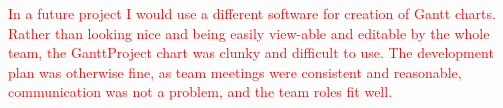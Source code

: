\documentclass{article}
\begin{document}
    \textcolor{red}{In a future project I would use a different software for creation of Gantt charts. Rather than looking nice and being easily view-able and editable by the whole team, the GanttProject chart was clunky and difficult to use.
    The development plan was otherwise fine, as team meetings were consistent and reasonable, communication was not a problem, and the team roles fit well.}
\end{document}
